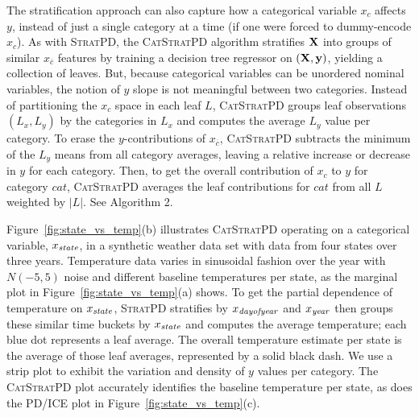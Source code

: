 \documentclass[12pt]{article}
\newcommand{\figref}[1]{Figure~\ref{#1}}
\newcommand{\spd}{\fontfamily{cmr}\textsc{\small StratPD}}
\newcommand{\cspd}{\fontfamily{cmr}\textsc{\small CatStratPD}}
\newcommand{\xnc}{$x_{\overline{c}}$}
\begin{document}
The stratification approach can also capture how a categorical variable $x_c$ affects $y$, instead of just a single category at a time (if one were forced to dummy-encode $x_c$). As with \spd{}, the \cspd{} algorithm stratifies $\bf X$ into groups of similar \xnc{} features by training a decision tree regressor on $({\bf X}, {\bf y})$, yielding a collection of leaves. But, because categorical variables can be unordered nominal variables, the notion of $y$ slope is not meaningful between two categories. Instead of partitioning the $x_c$ space in each leaf $L$, \cspd{} groups leaf observations $(L_x, L_y)$ by the categories in $L_x$ and computes the average $L_y$ value per category.  To erase the $y$-contributions of \xnc{}, \cspd{} subtracts the minimum of the $L_y$ means from all category averages, leaving a relative increase or decrease in $y$  for each category. Then, to get the overall contribution of $x_c$ to $y$ for category $cat$, \cspd{} averages the leaf contributions for $cat$ from all $L$ weighted by $|L|$. See Algorithm 2.

\figref{fig:state_vs_temp}(b) illustrates \cspd{} operating on a categorical variable, $x_{\it state}$, in a synthetic weather data set with data from four states over three years. Temperature data varies in sinusoidal fashion over the year with $N(-5,5)$ noise and different baseline temperatures per state, as the marginal plot in \figref{fig:state_vs_temp}(a) shows. To get the partial dependence of temperature on $x_{\it state}$, \spd{} stratifies by $x_{\it dayofyear}$ and $x_{\it year}$ then groups these similar time buckets by $x_{\it state}$ and computes the average temperature; each blue dot represents a leaf average. The overall temperature estimate per state is the average of those leaf averages, represented by a solid black dash. We use a strip plot to exhibit the variation and density of $y$ values per category. The \cspd{} plot accurately identifies the baseline temperature per state, as does the PD/ICE plot in \figref{fig:state_vs_temp}(c).
\end{document}
